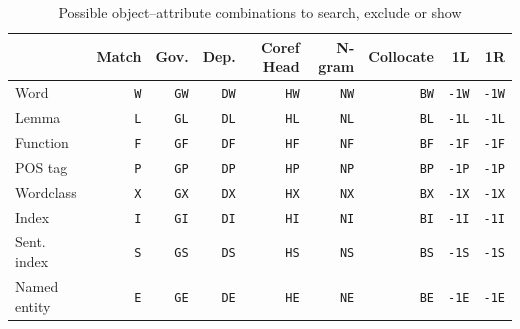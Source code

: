 \begin{table}[htb]
\centering
\small
\begin{tabular}{lrrrrrrrr}
\toprule
{} & Match & Gov. & Dep. & Coref Head & N-gram & Collocate & 1L & 1R \\
\midrule
Word          &     \texttt{W} &       \texttt{GW} &        \texttt{DW} &        \texttt{HW} &     \texttt{NW} &        \texttt{BW} &        \texttt{-1W} &        \texttt{-1W} \\
Lemma          &     \texttt{L} &       \texttt{GL} &        \texttt{DL} &        \texttt{HL} &     \texttt{NL} &        \texttt{BL} &        \texttt{-1L} &        \texttt{-1L} \\
Function       &     \texttt{F} &       \texttt{GF} &        \texttt{DF} &        \texttt{HF} &     \texttt{NF} &        \texttt{BF} &        \texttt{-1F} &        \texttt{-1F} \\
POS tag         &     \texttt{P} &       \texttt{GP} &        \texttt{DP} &        \texttt{HP} &     \texttt{NP} &        \texttt{BP} &        \texttt{-1P} &        \texttt{-1P} \\
Wordclass      &     \texttt{X} &       \texttt{GX} &        \texttt{DX} &        \texttt{HX} &     \texttt{NX} &        \texttt{BX} &        \texttt{-1X} &        \texttt{-1X} \\
Index          &     \texttt{I} &       \texttt{GI} &        \texttt{DI} &        \texttt{HI} &     \texttt{NI} &        \texttt{BI} &        \texttt{-1I} &        \texttt{-1I} \\
Sent. index &     \texttt{S} &       \texttt{GS} &        \texttt{DS} &        \texttt{HS} &     \texttt{NS} &        \texttt{BS} &        \texttt{-1S} &        \texttt{-1S} \\
Named entity &     \texttt{E} &       \texttt{GE} &        \texttt{DE} &        \texttt{HE} &     \texttt{NE} &        \texttt{BE} &        \texttt{-1E} &        \texttt{-1E} \\
\bottomrule
\end{tabular}
\caption[Possible object--attribute combinations]{Possible object--attribute combinations to search, exclude or show}
\label{tab:search-exclude-show}
\end{table}


